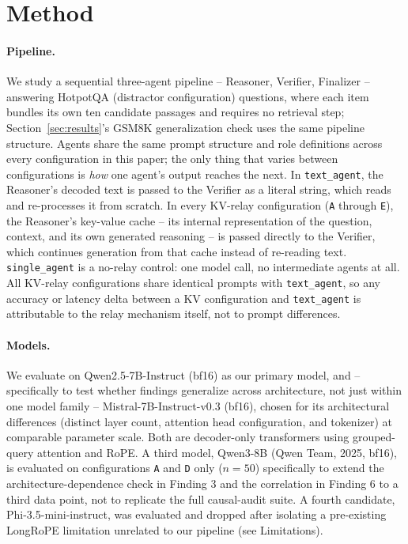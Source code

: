 \documentclass[11pt]{article}
\begin{document}
\section{Method}
\label{sec:method}

\paragraph{Pipeline.} We study a sequential three-agent pipeline --
Reasoner, Verifier, Finalizer -- answering HotpotQA
\citep{hotpotqa2018} (distractor configuration) questions, where each item
bundles its own ten candidate passages and requires no retrieval step;
Section~\ref{sec:results}'s GSM8K \citep{gsm8k2021} generalization check
uses the same pipeline structure. Agents share the same prompt structure
and role definitions across every configuration in this paper; the only
thing that varies between configurations is \emph{how} one agent's output
reaches the next. In \texttt{text\_agent}, the Reasoner's decoded text is
passed to the Verifier as a literal string, which reads and re-processes
it from scratch. In every KV-relay configuration (\texttt{A} through
\texttt{E}), the Reasoner's key-value cache -- its internal representation
of the question, context, and its own generated reasoning -- is passed
directly to the Verifier, which continues generation from that cache
instead of re-reading text. \texttt{single\_agent} is a no-relay control:
one model call, no intermediate agents at all. All KV-relay configurations
share identical prompts with \texttt{text\_agent}, so any accuracy or
latency delta between a KV configuration and \texttt{text\_agent} is
attributable to the relay mechanism itself, not to prompt differences.

\paragraph{Models.} We evaluate on Qwen2.5-7B-Instruct
\citep{qwen2p5_2024} (bf16) as our primary model, and -- specifically to
test whether findings generalize across architecture, not just within one
model family -- Mistral-7B-Instruct-v0.3 \citep{mistral7b2023} (bf16),
chosen for its architectural differences (distinct layer count, attention
head configuration, and tokenizer) at comparable parameter scale. Both are
decoder-only transformers using grouped-query attention and RoPE. A third
model, Qwen3-8B (Qwen Team, 2025, bf16), is evaluated on configurations
\texttt{A} and \texttt{D} only ($n=50$) specifically to extend the
architecture-dependence check in Finding 3 and the correlation in
Finding 6 to a third data point, not to replicate the full causal-audit
suite. A fourth candidate, Phi-3.5-mini-instruct, was evaluated and
dropped after isolating a pre-existing LongRoPE limitation unrelated to
our pipeline (see Limitations).
\end{document}
